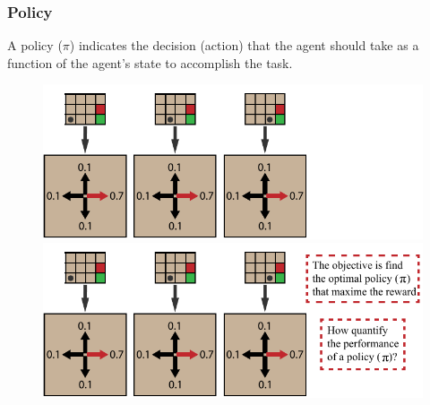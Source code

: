 \begin{frame}
	\frametitle{Policy}
	A policy ($\pi$) indicates the decision {\color{gray} (action)} that the agent should take as a function of the agent's state to accomplish the task\footnotemark[1].%
	
	\begin{figure}
		\begin{overprint}
			\includegraphics{policy_stochastic_1.pdf}
			\onslide<2>\includegraphics{policy_stochastic.pdf}
		\end{overprint}
		
	\end{figure}
	
\end{frame}



